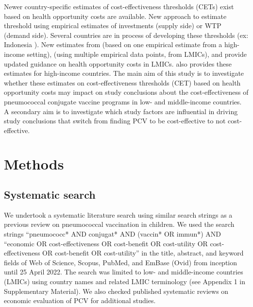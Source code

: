 \documentclass[12pt]{article}
\begin{document}
Newer country-specific estimates of cost-effectiveness thresholds (CETs) exist based on health opportunity costs are available. \supercite{ochalek_estimating_2018, pichon-riviere_determining_2023,woods_country-level_2016} New approach to estimate threshold using empirical estimates of investments (supply side) or WTP (demand side). Several countries are in process of developing these thresholds (ex: Indonesia ). New estimates from \textcite{woods_country-level_2016} (based on one empirical estimate from a high-income setting), \textcite{ochalek_estimating_2018} (using multiple empirical data points, from LMICs), and \textcite{pichon-riviere_determining_2023} provide updated guidance on health opportunity costs in LMICs. \textcite{woods_country-level_2016} also provides these estimates for high-income countries. The main aim of this study is to investigate whether these estimates on cost-effectiveness thresholds (CET) based on health opportunity costs may impact on study conclusions about the cost-effectiveness of pneumococcal conjugate vaccine programs in low- and middle-income countries. A secondary aim is to investigate which study factors are influential in driving study conclusions that switch from finding PCV to be cost-effective to not cost-effective.


\section{Methods}
\subsection{Systematic search}
We undertook a systematic literature search using similar search strings as a previous review on pneumococcal vaccination in children.\supercite{saokaew_cost_2016} We used the search strings “pneumococc* AND conjugat* AND (vaccin* OR immun*) AND “economic OR cost-effectiveness OR cost-benefit OR cost-utility OR cost-effectiveness OR cost-benefit OR cost-utility” in the title, abstract, and keyword fields of Web of Science, Scopus, PubMed, and EmBase (Ovid) from inception until 25 April 2022. The search was limited to low- and middle-income countries (LMICs) using country names and related LMIC terminology (see Appendix 1 in Supplementary Material). We also checked published systematic reviews on economic evaluation of PCV for additional studies.\supercite{saokaew_cost_2016, syeed_pneumococcal_2023, wang_systematic_2022, zakiyah_pneumococcal_2020}
\end{document}
